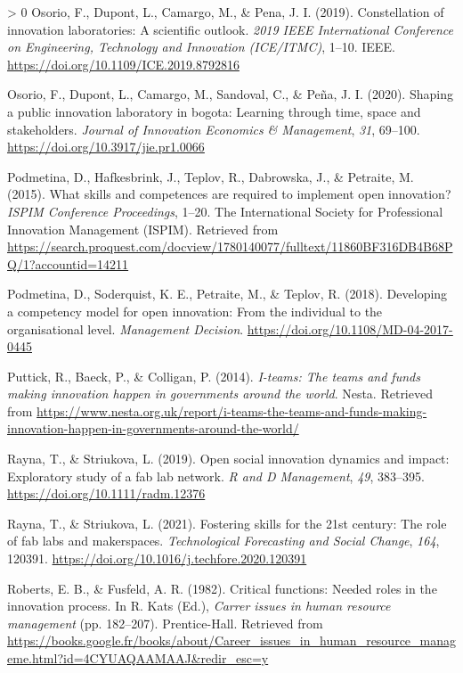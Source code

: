 \documentclass[]{elsarticle} %
\newlength{\cslhangindent}
\newenvironment{CSLReferences}[3] %
 {%
  \setlength{\parindent}{0pt}
  \ifodd #1 \everypar{\setlength{\hangindent}{\cslhangindent}}\ignorespaces\fi
  \ifnum #2 > 0
  \setlength{\parskip}{#2\baselineskip}
  \fi
 }%
 {}
\begin{document}
\begin{CSLReferences}{1}{0}
\leavevmode\hypertarget{ref-Osorio2019-A}{}%
Osorio, F., Dupont, L., Camargo, M., \& Pena, J. I. (2019).
Constellation of innovation laboratories: A scientific outlook.
\emph{2019 IEEE International Conference on Engineering, Technology and
Innovation (ICE/ITMC)}, 1--10. IEEE.
\url{https://doi.org/10.1109/ICE.2019.8792816}

\leavevmode\hypertarget{ref-Osorio2020}{}%
Osorio, F., Dupont, L., Camargo, M., Sandoval, C., \& Peña, J. I.
(2020). Shaping a public innovation laboratory in bogota: Learning
through time, space and stakeholders. \emph{Journal of Innovation
Economics \& Management}, \emph{31}, 69--100.
\url{https://doi.org/10.3917/jie.pr1.0066}

\leavevmode\hypertarget{ref-Podmetina2015}{}%
Podmetina, D., Hafkesbrink, J., Teplov, R., Dabrowska, J., \& Petraite,
M. (2015). What skills and competences are required to implement open
innovation? \emph{ISPIM Conference Proceedings}, 1--20. The
International Society for Professional Innovation Management (ISPIM).
Retrieved from
\url{https://search.proquest.com/docview/1780140077/fulltext/11860BF316DB4B68PQ/1?accountid=14211}

\leavevmode\hypertarget{ref-Podmetina2018}{}%
Podmetina, D., Soderquist, K. E., Petraite, M., \& Teplov, R. (2018).
Developing a competency model for open innovation: From the individual
to the organisational level. \emph{Management Decision}.
\url{https://doi.org/10.1108/MD-04-2017-0445}

\leavevmode\hypertarget{ref-Puttick2014-Teams}{}%
Puttick, R., Baeck, P., \& Colligan, P. (2014). \emph{I-teams: The teams
and funds making innovation happen in governments around the world}.
Nesta. Retrieved from
\url{https://www.nesta.org.uk/report/i-teams-the-teams-and-funds-making-innovation-happen-in-governments-around-the-world/}

\leavevmode\hypertarget{ref-Rayna2019}{}%
Rayna, T., \& Striukova, L. (2019). Open social innovation dynamics and
impact: Exploratory study of a fab lab network. \emph{R and D
Management}, \emph{49}, 383--395.
\url{https://doi.org/10.1111/radm.12376}

\leavevmode\hypertarget{ref-Rayna2021}{}%
Rayna, T., \& Striukova, L. (2021). Fostering skills for the 21st
century: The role of fab labs and makerspaces. \emph{Technological
Forecasting and Social Change}, \emph{164}, 120391.
\url{https://doi.org/10.1016/j.techfore.2020.120391}

\leavevmode\hypertarget{ref-Roberts1982}{}%
Roberts, E. B., \& Fusfeld, A. R. (1982). Critical functions: Needed
roles in the innovation process. In R. Kats (Ed.), \emph{Carrer issues
in human resource management} (pp. 182--207). Prentice-Hall. Retrieved
from
\url{https://books.google.fr/books/about/Career_issues_in_human_resource_manageme.html?id=4CYUAQAAMAAJ\&redir_esc=y}


\end{CSLReferences}
\end{document}
